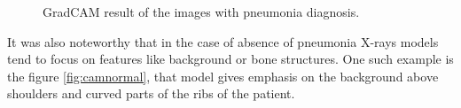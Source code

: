 \begin{figure}[H]%
    \centering
    \qquad
    \caption{GradCAM result of the images with pneumonia diagnosis.}%
    \label{fig:campnue}%
\end{figure}

It was also noteworthy that in the case of absence of pneumonia X-rays models tend to focus on features like background or bone structures.
One such example is the figure \ref{fig:camnormal}, that model gives emphasis on the background above shoulders and curved parts of the ribs of the patient.



